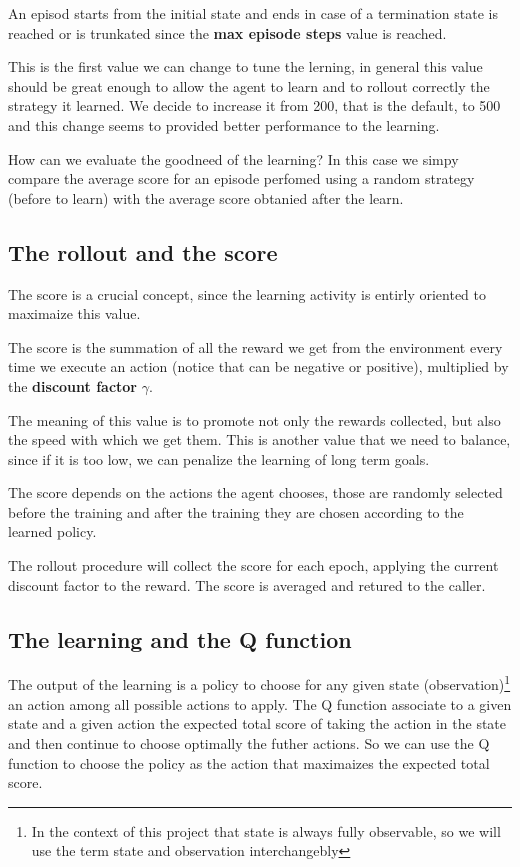 \documentclass{article}
\begin{document}
An episod starts from the initial state and ends in case of a termination state is reached or is trunkated since the \textbf{max episode steps} value is reached.

This is the first value we can change to tune the lerning, in general this value should be great enough to allow the agent to learn and to rollout correctly the strategy it learned.
We decide to increase it from 200, that is the default, to 500 and this change seems to provided better performance to the learning.

How can we evaluate the goodneed of the learning? In this case we simpy compare the average score for an episode perfomed using a random strategy (before to learn)
with the average score obtanied after the learn.

\subsection{The rollout and the score}

The score is a crucial concept, since the learning activity is entirly oriented to maximaize this value.

The score is the summation of all the reward we get from the environment every time we execute an action (notice that can be negative or positive),
multiplied by the \textbf{discount factor} $\gamma$.

The meaning of this value is to promote not only the rewards collected, but also the speed with which we get them.
This is another value that we need to balance, since if it is too low, we can penalize the learning of long term goals.

The score depends on the actions the agent chooses, those are randomly selected before the training 
and after the training they are chosen according to the learned policy.

The rollout procedure will collect the score for each epoch, applying the current discount factor to the reward.
The score is averaged and retured to the caller.

\subsection{The learning and the Q function}

The output of the learning is a policy to choose for any given state (observation)\footnote[2]{
In the context of this project that state is always fully observable, so we will use the term state and observation interchangebly} 
an action among all possible actions to apply.
The Q function associate to a given state and a given action the expected total score of taking the action in the state 
and then continue to choose optimally the futher actions.
So we can use the Q function to choose the policy as the action that maximaizes the expected total score.
\end{document}
